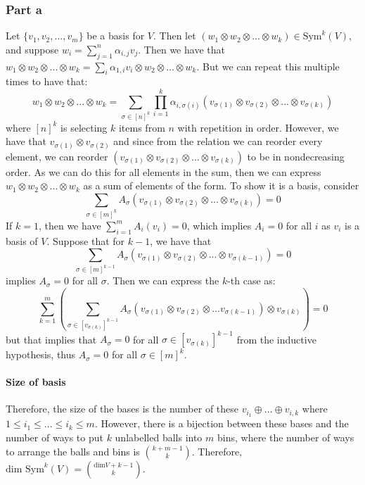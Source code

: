 \documentclass[]{article}
\begin{document}
\subsubsection{Part a}
Let $\lbrace v_1, v_2, ..., v_m \rbrace$ be a basis for $V$. Then let $(w_1 \otimes w_2 \otimes ... \otimes w_k) \in \text{Sym}^k(V)$, and suppose $w_i = \sum_{j = 1}^n \alpha_{i,j} v_j$. Then we have that $w_1 \otimes w_2 \otimes ... \otimes w_k = \sum_{i} \alpha_{1, i} v_i \otimes w_2 \otimes ... \otimes w_k$. But we can repeat this multiple times to have that:
\begin{equation}
	w_1 \otimes w_2 \otimes ... \otimes w_k = \sum_{\sigma \in [n]^k} \prod_{i = 1}^k \alpha_{i,\sigma(i)} (v_{\sigma(1)} \otimes v_{\sigma(2)} \otimes ... \otimes v_{\sigma(k)})
\end{equation}
where $[n]^k$ is selecting $k$ items from $n$ with repetition in order. However, we have that $v_{\sigma(1)} \otimes v_{\sigma(2)}$ and since from the relation we can reorder every element, we can reorder $(v_{\sigma(1)} \otimes v_{\sigma(2)} \otimes ... \otimes v_{\sigma(k)})$ to be in nondecreasing order. As we can do this for all elements in the sum, then we can express $w_1 \otimes w_2 \otimes ... \otimes w_k$ as a sum of elements of the form. To show it is a basis, consider
\begin{equation}
	\sum_{\sigma \in [m]^k} A_{\sigma} (v_{\sigma(1)} \otimes v_{\sigma(2)} \otimes ... \otimes v_{\sigma(k)}) = 0
\end{equation}
If $k = 1$, then we have $\sum_{i = 1}^m A_{i} (v_{i}) = 0$, which implies $A_i = 0$ for all $i$ as $v_i$ is a basis of $V$. Suppose that for $k-1$, we have that
\begin{equation}
	\sum_{\sigma \in [m]^{k-1}} A_{\sigma} (v_{\sigma(1)} \otimes v_{\sigma(2)} \otimes ... \otimes v_{\sigma(k-1)}) = 0
\end{equation}
implies $A_{\sigma} = 0$ for all $\sigma$. Then we can express the $k$-th case as:
\begin{equation}
	 \sum_{k = 1}^m (\sum_{\sigma \in [v_{\sigma(k)}]^{k-1}} A_{\sigma}(v_{\sigma(1)} \otimes v_{\sigma(2)} \otimes ... v_{\sigma(k-1)}) \otimes v_{\sigma(k)}) = 0
\end{equation}
but that implies that $A_{\sigma} = 0$ for all $\sigma \in [v_{\sigma(k)}]^{k-1}$ from the inductive hypothesis, thus $A_{\sigma} = 0$ for all $\sigma \in [m]^k$.
\paragraph{Size of basis}
Therefore, the size of the bases is the number of these $v_{i_1} \oplus ... \oplus v_{i, k}$ where $1 \leq i_1 \leq ... \leq i_k \leq m$. However, there is a bijection between these bases and the number of ways to put $k$ unlabelled balls into $m$ bins, where the number of ways to arrange the balls and bins is $\binom{k + m - 1}{k}$. Therefore, $\text{dim Sym}^k (V) = \binom{\text{dim} V + k - 1}{k}$.
\end{document}
